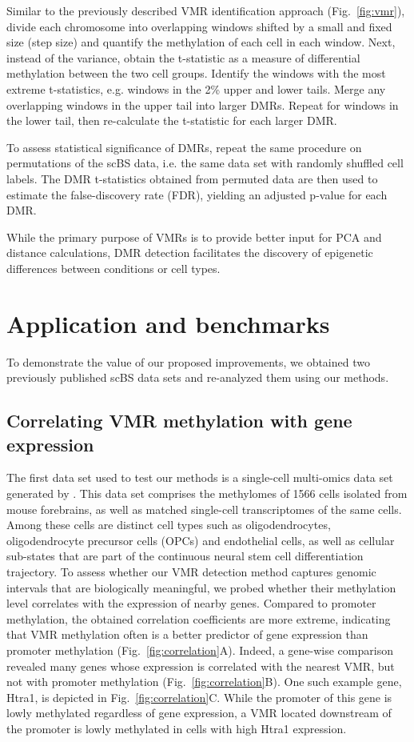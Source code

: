 \documentclass[twocolumn,10pt]{article}
\begin{document}
Similar to the previously described VMR identification approach (Fig.~\ref{fig:vmr}), divide each chromosome into overlapping windows shifted by a small and fixed size (step size) and quantify the methylation of each cell in each window.
Next, instead of the variance, obtain the t-statistic %
as a measure of differential methylation between the two cell groups.
Identify the windows with the most extreme t-statistics, e.g. windows in the 2\% upper and lower tails.
Merge any overlapping windows in the upper tail into larger DMRs.
Repeat for windows in the lower tail, then re-calculate the t-statistic for each larger DMR.

To assess statistical significance of DMRs, repeat the same procedure on permutations of the scBS data, i.e. the same data set with randomly shuffled cell labels.
The DMR t-statistics obtained from permuted data are then used to estimate the false-discovery rate (FDR), yielding an adjusted p-value for each DMR.

While the primary purpose of VMRs is to provide better input for PCA and distance calculations, DMR detection facilitates the discovery of epigenetic differences between conditions or cell types.


\section{Application and benchmarks}

To demonstrate the value of our proposed improvements, we obtained two previously published scBS data sets and re-analyzed them using our methods.

\subsection{Correlating VMR methylation with gene expression}

The first data set used to test our methods is a single-cell multi-omics data set generated by \citet{kremer_scnmt}.
This data set comprises the methylomes of 1566 cells isolated from mouse forebrains, as well as matched single-cell transcriptomes of the same cells.
Among these cells are distinct cell types such as oligodendrocytes, oligodendrocyte precursor cells (OPCs) and endothelial cells, as well as cellular sub-states that are part of the continuous neural stem cell differentiation trajectory.
To assess whether our VMR detection method captures genomic intervals that are biologically meaningful, we probed whether their methylation level correlates with the expression of nearby genes.
Compared to promoter methylation, the obtained correlation coefficients are more extreme, indicating that VMR methylation often is a better predictor of gene expression than promoter methylation (Fig.~\ref{fig:correlation}A).
Indeed, a gene-wise comparison revealed many genes whose expression is correlated with the nearest VMR, but not with promoter methylation (Fig.~\ref{fig:correlation}B).
One such example gene, Htra1, is depicted in Fig.~\ref{fig:correlation}C.
While the promoter of this gene is lowly methylated regardless of gene expression, a VMR located downstream of the promoter is lowly methylated in cells with high Htra1 expression.
\end{document}
